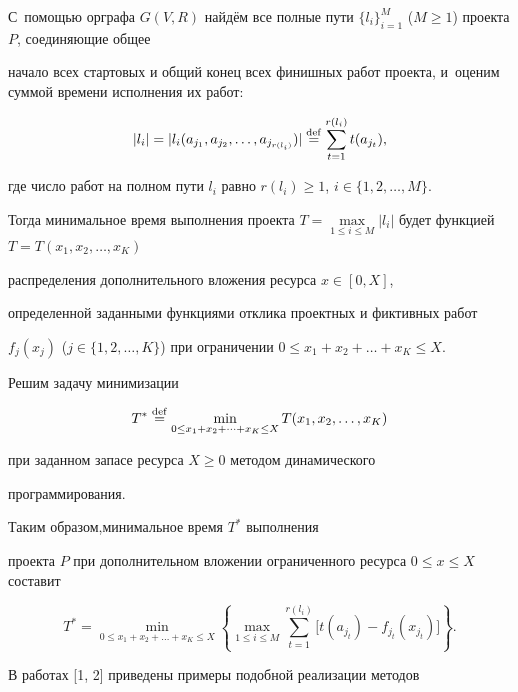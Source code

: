 

С~помощью орграфа $G (V, R)$ найдём все полные пути $\{l_i\}^{M}_{i=1}$ ($M\geq 1$) проекта $P$, соединяющие общее

начало всех стартовых и общий конец всех финишных работ проекта, и~оценим суммой времени исполнения их работ:

$$

|l_i|=|l_i(a_{j_1}, a_{j_2}, \dots, a_{j_{r(l_i)}})|\stackrel{\rm def}=\sum^{r(l_i)}_{t=1} t (a_{j_t}),

$$

где число работ на полном пути $l_i$ равно $r(l_i)\geq 1$, $i\in \{1, 2, \dots, M\}$.



Тогда минимальное время выполнения проекта $T=\max\limits_{1\leq i\leq M}|l_i|$ будет функцией $T=T(x_1, x_2, \dots, x_K)$

распределения дополнительного вложения ресурса $x\in [0, X]$,

определенной заданными функциями отклика проектных и фиктивных работ

$f_{j}(x_{j})$ ($j\in \{1, 2, \dots, K\}$) при ограничении $0\leq x_1+x_2+\dots+x_K\leq X$.



Решим задачу минимизации

$$

T^{*} \stackrel{\rm def}=

\min_{0\leq x_1+x_2+\dots+x_K\leq X} T(x_1, x_2,\dots, x_K)$$

при заданном запасе ресурса $X\geq 0$ методом динамического

программирования. 

Таким образом,минимальное время $T^{*}$ выполнения

проекта $P$ при дополнительном вложении ограниченного ресурса $0\leq

x\leq X$ составит

$$

T^{*}=\min_{0\leq x_1 +x_2+\dots+x_K\leq X}

\left\{

\max_{1\leq i\leq M} \sum^{r(l_i)}_{t=1}\bigl[t(a_{j_t})-f_{j_t}(x_{j_t}) \bigr]\right\}.$$



В работах [1, 2] приведены примеры подобной реализации методов

